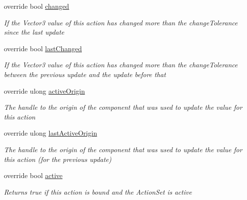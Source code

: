 \begin{DoxyCompactItemize}
override bool \mbox{\hyperlink{class_valve_1_1_v_r_1_1_steam_v_r___action___vector3___source_ac9a707e227aad74ebdebb5bc7c9d48b9}{changed}}
\begin{DoxyCompactList}\small\item\em If the Vector3 value of this action has changed more than the change\+Tolerance since the last update \end{DoxyCompactList}\item 
override bool \mbox{\hyperlink{class_valve_1_1_v_r_1_1_steam_v_r___action___vector3___source_ad317cbb26225c250e94a5a3cd01265c1}{last\+Changed}}
\begin{DoxyCompactList}\small\item\em If the Vector3 value of this action has changed more than the change\+Tolerance between the previous update and the update before that \end{DoxyCompactList}\item 
override ulong \mbox{\hyperlink{class_valve_1_1_v_r_1_1_steam_v_r___action___vector3___source_a8594f54d1a0e5cc7148a4c84dd0b423e}{active\+Origin}}
\begin{DoxyCompactList}\small\item\em The handle to the origin of the component that was used to update the value for this action \end{DoxyCompactList}\item 
override ulong \mbox{\hyperlink{class_valve_1_1_v_r_1_1_steam_v_r___action___vector3___source_a9249c5e84bc62f85642b01ddd17bbc57}{last\+Active\+Origin}}
\begin{DoxyCompactList}\small\item\em The handle to the origin of the component that was used to update the value for this action (for the previous update) \end{DoxyCompactList}\item 
override bool \mbox{\hyperlink{class_valve_1_1_v_r_1_1_steam_v_r___action___vector3___source_aa0b9023adebad29fdf26a909301f956f}{active}}
\begin{DoxyCompactList}\small\item\em Returns true if this action is bound and the Action\+Set is active \end{DoxyCompactList}\item 

\end{DoxyCompactItemize}
